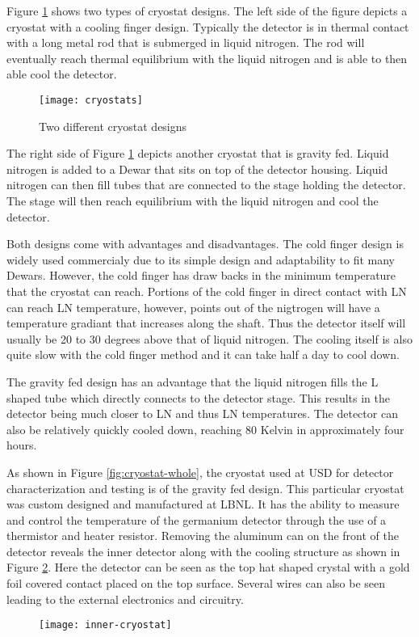 Figure \ref{fig:cryostats} shows two types of cryostat designs.
The left side of the figure depicts a cryostat with a cooling finger design.
Typically the detector is in thermal contact with a long metal rod that is submerged in liquid nitrogen.
The rod will eventually reach thermal equilibrium with the liquid nitrogen and is able to then able cool the detector.
\begin{figure}[htpb]
\centering
\texttt{[image: cryostats]}
\caption{Two different cryostat designs}
\label{fig:cryostats}
\end{figure}
The right side of Figure \ref{fig:cryostats} depicts another cryostat that is gravity fed.
Liquid nitrogen is added to a Dewar that sits on top of the detector housing.
Liquid nitrogen can then fill tubes that are connected to the stage holding the detector.
The stage will then reach equilibrium with the liquid nitrogen and cool the detector.

Both designs come with advantages and disadvantages.
The cold finger design is widely used commercialy due to its simple design and adaptability to fit many Dewars.
However, the cold finger has draw backs in the minimum temperature that the cryostat can reach.
Portions of the cold finger in direct contact with LN can reach LN temperature, however, points out of the nigtrogen will have a temperature gradiant that increases along the shaft.
Thus the detector itself will usually be 20 to 30 degrees above that of liquid nitrogen.
The cooling itself is also quite slow with the cold finger method and it can take half a day to cool down.

The gravity fed design has an advantage that the liquid nitrogen fills the L shaped tube which directly connects to the detector stage.
This results in the detector being much closer to LN  and thus LN temperatures.
The detector can also be relatively quickly cooled down, reaching 80 Kelvin in approximately four hours.


As shown in Figure \ref{fig:cryostat-whole}, the cryostat used at USD for detector characterization and testing is of the gravity fed design.
This particular cryostat was custom designed and manufactured at LBNL.
It has the ability to measure and control the temperature of the germanium detector through the use of a thermistor and heater resistor.
Removing the aluminum can on the front of the detector reveals the inner detector along with the cooling structure as shown in Figure \ref{fig:inner-cryostat}.
Here the detector can be seen as the top hat shaped crystal with a gold foil covered contact placed on the top surface.
Several wires can also be seen leading to the external electronics and circuitry.
\begin{figure}[htpb]
\centering
\texttt{[image: inner-cryostat]}
\caption{}
\label{fig:inner-cryostat}
\end{figure}

